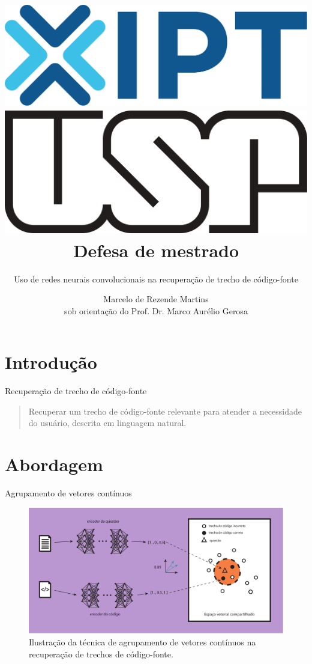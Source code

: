 \documentclass[10pt]{beamer}
\title{\includegraphics[scale=0.15]{figuras/logo-ipt.pdf} \hfill \includegraphics[scale=0.1]{figuras/usp-logo.pdf}\\Defesa de mestrado}
\subtitle{Uso de redes neurais convolucionais na recuperação de trecho de código-fonte}
\date{}
\author{Marcelo de Rezende Martins\\{\footnotesize sob orientação do Prof. Dr. Marco Aurélio Gerosa}}
\institute{Instituto de Pesquisas Tecnológicas do Estado de São Paulo - IPT}
\begin{document}
\maketitle



\section[Intro]{Introdução}


\begin{frame}[fragile]{Recuperação de trecho de código-fonte}

\begin{quote}
Recuperar um trecho de código-fonte relevante para atender a necessidade do usuário, descrita em linguagem natural.     
\end{quote}


\end{frame}



\section{Abordagem}

\begin{frame}{Agrupamento de vetores contínuos}
    \begin{figure}[h]
        \centering
        \includegraphics[width=1\linewidth]{figuras/joint_embedding.pdf}
        \caption{Ilustração da técnica de agrupamento de vetores contínuos na recuperação de trechos de código-fonte. }
        \label{fig:joint-embedding}
    \end{figure}
\end{frame}
\end{document}
